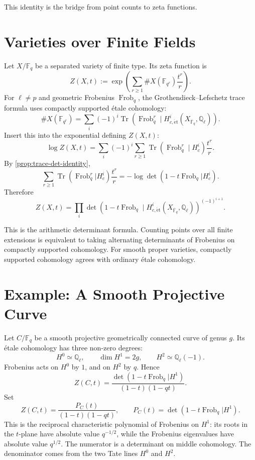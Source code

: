 \documentclass[11pt]{memoir}
\providecommand{\Tr}{\operatorname{Tr}}
\providecommand{\Frob}{\operatorname{Frob}}
\providecommand{\bF}{\mathbb{F}}
\providecommand{\bQ}{\mathbb{Q}}
\providecommand{\Cref}[1]{\ref{#1}}
\begin{document}
This identity is the bridge from point counts to zeta functions.

\section{Varieties over Finite Fields}
\label{sec:finite-field-zeta}

Let \(X/\bF_q\) be a separated variety of finite type. Its zeta function is
\[
  Z(X,t):=
  \exp\left(\sum_{r\geq1}\#X(\bF_{q^r})\frac{t^r}{r}\right).
\]
For \(\ell\neq p\) and geometric Frobenius \(\Frob_q\), the
Grothendieck--Lefschetz trace formula uses compactly supported
étale cohomology:
\[
  \#X(\bF_{q^r})
  =
  \sum_i(-1)^i
  \Tr\left(\Frob_q^r\mid H^i_{c,\mathrm{\acute et}}(X_{\overline{\bF}_q},\bQ_\ell)\right).
\]
Insert this into the exponential defining \(Z(X,t)\):
\[
  \log Z(X,t)
  =
  \sum_i(-1)^i
  \sum_{r\geq1}
  \Tr\left(\Frob_q^r\mid H^i_c\right)\frac{t^r}{r}.
\]
By \Cref{prop:trace-det-identity},
\[
  \sum_{r\geq1}\Tr(\Frob_q^r|H^i_c)\frac{t^r}{r}
  =
  -\log\det(1-t\Frob_q|H^i_c).
\]
Therefore
\[
  Z(X,t)
  =
  \prod_i
  \det\left(1-t\Frob_q\mid
  H^i_{c,\mathrm{\acute et}}(X_{\overline{\bF}_q},\bQ_\ell)\right)^{(-1)^{i+1}}.
\]

This is the arithmetic determinant formula. Counting points over all
finite extensions is equivalent to taking alternating determinants of
Frobenius on compactly supported cohomology. For smooth proper
varieties, compactly supported cohomology agrees with ordinary
étale cohomology.

\section{Example: A Smooth Projective Curve}
\label{sec:curve-zeta}

Let \(C/\bF_q\) be a smooth projective geometrically connected curve
of genus \(g\). Its étale cohomology has three non-zero degrees:
\[
  H^0\simeq \bQ_\ell,\qquad
  \dim H^1=2g,\qquad
  H^2\simeq \bQ_\ell(-1).
\]
Frobenius acts on \(H^0\) by \(1\), and on \(H^2\) by \(q\). Hence
\[
  Z(C,t)
  =
  \frac{\det(1-t\Frob_q|H^1)}
  {(1-t)(1-qt)}.
\]
Set
\[
  Z(C,t)=\frac{P_C(t)}{(1-t)(1-qt)},
  \qquad
  P_C(t)=\det(1-t\Frob_q|H^1).
\]
This is the reciprocal characteristic polynomial of Frobenius on
\(H^1\): its roots in the \(t\)-plane have absolute value
\(q^{-1/2}\), while the Frobenius eigenvalues have absolute value
\(q^{1/2}\).
The numerator is a determinant on middle cohomology. The denominator
comes from the two Tate lines \(H^0\) and \(H^2\).
\end{document}
